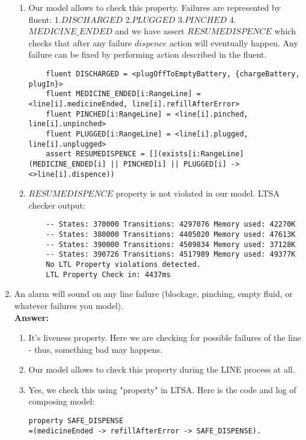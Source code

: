 \documentclass{article}
\begin{document}
\begin{enumerate}
\begin{enumerate}
    \item Our model allows to check this property. Failures are represented by fluent: 1.$DISCHARGED$ 2.$PLUGGED$ 
    3.$PINCHED$ 4.$MEDICINE\_ENDED$ and we have assert $RESUMEDISPENCE$ which checks that after any failure $dispence$ action
    will eventually happen. Any failure can be fixed by performing action described in the fluent.\\
    \begin{verbatim}
    fluent DISCHARGED = <plugOffToEmptyBattery, {chargeBattery, plugIn}>
    fluent MEDICINE_ENDED[i:RangeLine] = <line[i].medicineEnded, line[i].refillAfterError>
    fluent PINCHED[i:RangeLine] = <line[i].pinched, line[i].unpinched>
    fluent PLUGGED[i:RangeLine] = <line[i].plugged, line[i].unplugged>
    assert RESUMEDISPENCE = [](exists[i:RangeLine](MEDICINE_ENDED[i] || PINCHED[i] || PLUGGED[i] -> <>line[i].dispence))
    \end{verbatim}
    
    \item $RESUMEDISPENCE$ property is not violated in our model. LTSA checker output:
    \begin{verbatim}
    -- States: 370000 Transitions: 4297076 Memory used: 42270K
    -- States: 380000 Transitions: 4405020 Memory used: 47613K
    -- States: 390000 Transitions: 4509834 Memory used: 37128K
    -- States: 390726 Transitions: 4517989 Memory used: 49377K
    No LTL Property violations detected.
    LTL Property Check in: 4437ms
    \end{verbatim} 
    \end{enumerate}    
    
    
    
    \item An alarm will sound on any line failure (blockage, pinching, empty fluid, or
whatever failures you model).\\
    \textbf{Answer:}
    \begin{enumerate}
    	\item It's liveness property. Here we are checking for possible failures of the line - thus, something bad may happens.
		\item Our model allows to check this property during the LINE process at all.
		\item Yes, we check this using "property" in LTSA. Here is the code and log of composing model:
\begin{verbatim}
property SAFE_DISPENSE
=(medicineEnded -> refillAfterError -> SAFE_DISPENSE).


\end{verbatim}
\end{enumerate}
\end{enumerate}
\end{document}

